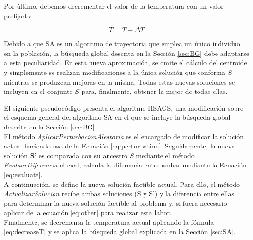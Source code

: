 Por último, debemos decrementar el valor de la temperatura con un valor prefijado: 

\begin{equation} \label{eq:decreaseT}
    T = T - \Delta T
\end{equation}

Debido a que SA es un algoritmo de trayectoria que emplea un único individuo en la población, la búsqueda global descrita en la Sección \ref{sec:BG} debe adaptarse a esta peculiaridad. En esta nueva aproximación, se omite el cálculo del centroide y simplemente se realizan modificaciones a la única solución que conforma $S$ mientras se produzcan mejoras en la misma. Todas estas nuevas soluciones se incluyen en el conjunto $S$ para, finalmente, obtener la mejor de todas ellas. 


\clearpage

El siguiente pseudocódigo presenta el algoritmo HSAGS, una modificación sobre el esquema general del algoritmo SA \cite{SA1} en el que se incluye la búsqueda global descrita en la Sección \ref{sec:BG}. \\
El método \textit{AplicarPerturbacionAleatoria} es el encargado de modificar la solución actual haciendo uso de la Ecuación \ref{eq:perturbation}. Seguidamente, la nueva solución \textbf{S'} es comparada con su ancestro \textit{S} mediante el método \textit{EvaluarDiferencia} el cual, calcula la diferencia entre ambas mediante la Ecuación \ref{eq:evaluate}. \\
A continuación, se define la nueva solución factible actual. Para ello, el método \textit{ActualizarSolucion} recibe ambas soluciones (S y S') y la diferencia entre ellas para determinar la nueva solución factible al problema y, si fuera necesario aplicar de la ecuación \ref{eq:other} para realizar esta labor. \\
Finalmente, se decrementa la temperatura actual aplicando la fórmula \ref{eq:decreaseT} y se aplica la búsqueda global explicada en la Sección \ref{sec:SA}.



